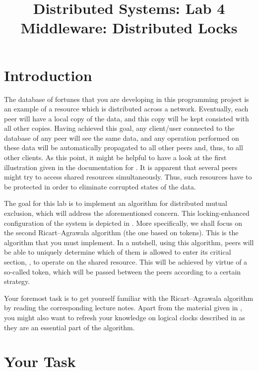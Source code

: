 \documentclass[a4paper]{article}
\title{%
  Distributed Systems: Lab 4\\%
  Middleware: Distributed Locks%
}
\author{}
\date{}
\begin{document}
\maketitle

\section{Introduction}

The database of fortunes that you are developing in this programming project is
an example of a resource which is distributed across a network. Eventually, each
peer will have a local copy of the data, and this copy will be kept consisted
with all other copies. Having achieved this goal, any client/user connected to
the database of any peer will see the same data, and any operation performed on
these data will be automatically propagated to all other peers and, thus, to all
other clients. As this point, it might be helpful to have a look at the first
illustration given in the documentation for . It is apparent that
several peers might try to access shared resources simultaneously. Thus, such
resources have to be protected in order to eliminate corrupted states of the
data.

The goal for this lab is to implement an algorithm for distributed
mutual exclusion, which will address the aforementioned concern. This
locking-enhanced configuration of the system is depicted in
. More specifically, we shall focus on the second
Ricart--Agrawala algorithm \cite{lecture67} (the one based on
tokens). This is the algorithm that you must implement. In a nutshell,
using this algorithm, peers will be able to uniquely determine which
of them is allowed to enter its critical section, \ie, to operate on
the shared resource. This will be achieved by virtue of a so-called
token, which will be passed between the peers according to a certain
strategy.

Your foremost task is to get yourself familiar with the Ricart--Agrawala
algorithm by reading the corresponding lecture notes. Apart from the material
given in \cite{lecture67}, you might also want to refresh your knowledge on
logical clocks described in \cite{lecture5} as they are an essential part of the
algorithm.

\section{Your Task}
\end{document}
